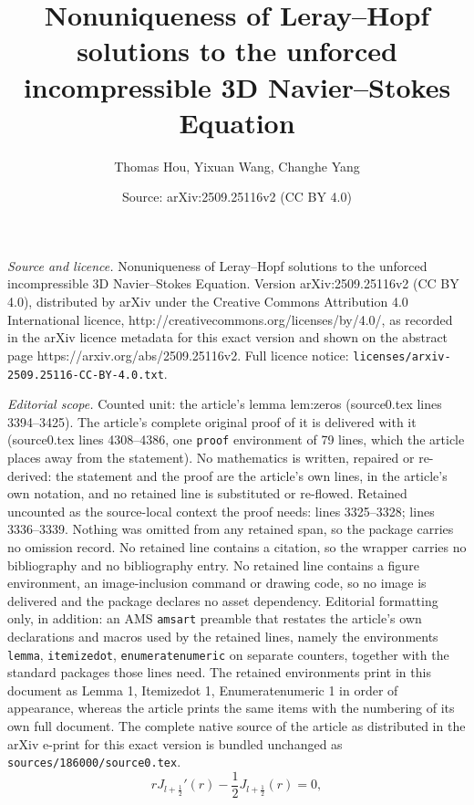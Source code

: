 \documentclass[10pt,a4paper]{amsart}
\title{Nonuniqueness of Leray--Hopf solutions to the unforced incompressible 3D Navier--Stokes Equation}
\author{Thomas Hou, Yixuan Wang, Changhe Yang}
\date{Source: arXiv:2509.25116v2 (CC BY 4.0)}
\begin{document}
\maketitle

\noindent\emph{Source and licence.} Nonuniqueness of Leray--Hopf solutions to the unforced incompressible 3D Navier--Stokes Equation. Version arXiv:2509.25116v2 (CC BY 4.0), distributed by arXiv under the Creative Commons Attribution 4.0 International licence, http://creativecommons.org/licenses/by/4.0/, as recorded in the arXiv licence metadata for this exact version and shown on the abstract page https://arxiv.org/abs/2509.25116v2. Full licence notice: \texttt{licenses/arxiv-2509.25116-CC-BY-4.0.txt}.\par\smallskip

\noindent\textit{Editorial scope.} Counted unit: the article's lemma lem:zeros (source0.tex lines 3394--3425). The article's complete original proof of it is delivered with it (source0.tex lines 4308--4386, one \texttt{proof} environment of 79 lines, which the article places away from the statement). No mathematics is written, repaired or re-derived: the statement and the proof are the article's own lines, in the article's own notation, and no retained line is substituted or re-flowed.  Retained uncounted as the source-local context the proof needs: lines 3325--3328; lines 3336--3339.  Nothing was omitted from any retained span, so the package carries no omission record.  No retained line contains a citation, so the wrapper carries no bibliography and no bibliography entry.  No retained line contains a figure environment, an image-inclusion command or drawing code, so no image is delivered and the package declares no asset dependency.  Editorial formatting only, in addition: an AMS \texttt{amsart} preamble that restates the article's own declarations and macros used by the retained lines, namely the environments \texttt{lemma}, \texttt{itemizedot}, \texttt{enumeratenumeric} on separate counters, together with the standard packages those lines need.  The retained environments print in this document as Lemma 1, Itemizedot 1, Enumeratenumeric 1 in order of appearance, whereas the article prints the same items with the numbering of its own full document.  The complete native source of the article as distributed in the arXiv e-print for this exact version is bundled unchanged as \texttt{sources/186000/source0.tex}.
  \begin{equation}
    rJ_{l + \frac{1}{2}}' (r) - \frac{1}{2} J_{l + \frac{1}{2}} (r) = 0,
    \label{eq:alphaZ}
  \end{equation}
\end{document}
